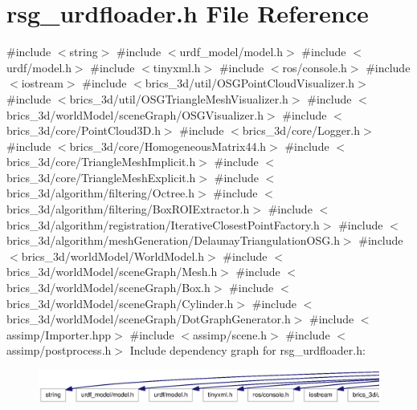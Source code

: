 \section{rsg\-\_\-urdfloader.\-h \-File \-Reference}
\label{rsg__urdfloader_8h}
{\ttfamily \#include $<$string$>$}\*
{\ttfamily \#include $<$urdf\-\_\-model/model.\-h$>$}\*
{\ttfamily \#include $<$urdf/model.\-h$>$}\*
{\ttfamily \#include $<$tinyxml.\-h$>$}\*
{\ttfamily \#include $<$ros/console.\-h$>$}\*
{\ttfamily \#include $<$iostream$>$}\*
{\ttfamily \#include $<$brics\-\_\-3d/util/\-O\-S\-G\-Point\-Cloud\-Visualizer.\-h$>$}\*
{\ttfamily \#include $<$brics\-\_\-3d/util/\-O\-S\-G\-Triangle\-Mesh\-Visualizer.\-h$>$}\*
{\ttfamily \#include $<$brics\-\_\-3d/world\-Model/scene\-Graph/\-O\-S\-G\-Visualizer.\-h$>$}\*
{\ttfamily \#include $<$brics\-\_\-3d/core/\-Point\-Cloud3\-D.\-h$>$}\*
{\ttfamily \#include $<$brics\-\_\-3d/core/\-Logger.\-h$>$}\*
{\ttfamily \#include $<$brics\-\_\-3d/core/\-Homogeneous\-Matrix44.\-h$>$}\*
{\ttfamily \#include $<$brics\-\_\-3d/core/\-Triangle\-Mesh\-Implicit.\-h$>$}\*
{\ttfamily \#include $<$brics\-\_\-3d/core/\-Triangle\-Mesh\-Explicit.\-h$>$}\*
{\ttfamily \#include $<$brics\-\_\-3d/algorithm/filtering/\-Octree.\-h$>$}\*
{\ttfamily \#include $<$brics\-\_\-3d/algorithm/filtering/\-Box\-R\-O\-I\-Extractor.\-h$>$}\*
{\ttfamily \#include $<$brics\-\_\-3d/algorithm/registration/\-Iterative\-Closest\-Point\-Factory.\-h$>$}\*
{\ttfamily \#include $<$brics\-\_\-3d/algorithm/mesh\-Generation/\-Delaunay\-Triangulation\-O\-S\-G.\-h$>$}\*
{\ttfamily \#include $<$brics\-\_\-3d/world\-Model/\-World\-Model.\-h$>$}\*
{\ttfamily \#include $<$brics\-\_\-3d/world\-Model/scene\-Graph/\-Mesh.\-h$>$}\*
{\ttfamily \#include $<$brics\-\_\-3d/world\-Model/scene\-Graph/\-Box.\-h$>$}\*
{\ttfamily \#include $<$brics\-\_\-3d/world\-Model/scene\-Graph/\-Cylinder.\-h$>$}\*
{\ttfamily \#include $<$brics\-\_\-3d/world\-Model/scene\-Graph/\-Dot\-Graph\-Generator.\-h$>$}\*
{\ttfamily \#include $<$assimp/\-Importer.\-hpp$>$}\*
{\ttfamily \#include $<$assimp/scene.\-h$>$}\*
{\ttfamily \#include $<$assimp/postprocess.\-h$>$}\*
\-Include dependency graph for rsg\-\_\-urdfloader.\-h\-:
\nopagebreak
\begin{figure}[H]
\begin{center}
\leavevmode
\includegraphics[width=350pt]{rsg__urdfloader_8h__incl}
\end{center}
\end{figure}
